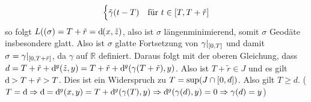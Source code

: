 \begin{enumerate}[(a)]
\[\begin{cases}
\tilde{\gamma}(t-T) &\text{für}\ t\in [T,T+\tilde{r}]
\end{cases}
\]
so folgt $L((\sigma) = T + \tilde{r} = \mathrm{d}\mkern-1.0mu(x,\tilde{z})$, also ist $\sigma$ längenminimierend, somit $\sigma$ Geodäte insbesondere glatt. Also ist $\sigma$ glatte Fortsetzung von $\gamma\vert_{[0,T]}$ und damit $\sigma = \gamma\vert_{[0,T+\tilde{r}]}$, da $\gamma$ auf $\mathds{R}$ definiert.
Daraus folgt mit der oberen Gleichung, dass $d = T +\tilde{r} + \mathrm{d}\mkern-1.0mu^g(\tilde{z},y) = T + \tilde{r} + \mathrm{d}\mkern-1.0mu^g(\gamma(T+\tilde{r}),y)$.
Also ist $T+\tilde{r} \in J$ und es gilt $\mathrm{d}\mkern-1.0mu > T + \tilde{r} > T$. Dies ist ein Widerspruch zu $T = \sup (J\cap [0,d])$.
Also gilt $T\geq d$. ($T = \mathrm{d}\mkern-1.0mu \Rightarrow \mathrm{d}\mkern-1.0mu = \mathrm{d}\mkern-1.0mu^g(x,y) = T + \mathrm{d}\mkern-1.0mu^g(\gamma(T),y) \Rightarrow \mathrm{d}\mkern-1.0mu^g(\gamma(d),y) = 0 \Rightarrow \gamma(d) = y$)
\end{enumerate}

